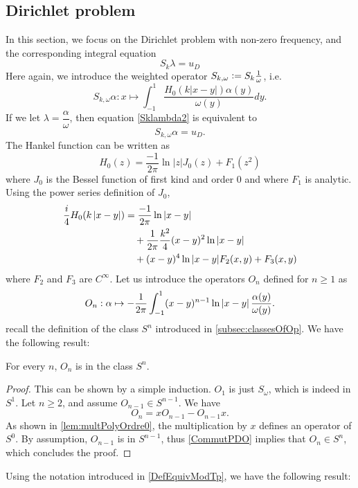\documentclass[a4paper]{article}
\begin{document}
	\subsection{Dirichlet problem}
	
	In this section, we focus on the Dirichlet problem with non-zero frequency, and the corresponding integral equation 
	\begin{equation}
	S_k \lambda = u_D
	\label{Sklambda2}
	\end{equation}
	Here again, we introduce the weighted operator $S_{k,\omega} \mathrel{\mathop:}= S_k \frac{1}{\omega}$, i.e.
	\[S_{k,\omega}\alpha : x \mapsto \int_{-1}^1 \dfrac{H_0(k|x-y|) \alpha(y)}{\omega(y)}dy.\]
	If we let $\lambda = \dfrac{\alpha}{\omega}$, then equation \eqref{Sklambda2} is equivalent to
	\[S_{k,\omega}\alpha = u_D.\]
	The Hankel function can be written as 
	\[H_0(z) = \frac{-1}{2\pi}\ln|z| J_0(z) + F_1(z^2)\]
	where $J_0$ is the Bessel function of first kind and order $0$ and where $F_1$ is analytic. Using the power series definition of $J_0$, 
	\begin{align}
	\begin{split}
	\frac{i}{4}H_0(k \left\lvert x - y \right\rvert) &= \frac{-1}{2\pi}\ln |x-y| \label{decompHankel}\\ 
	&\quad + \frac{1}{2\pi} \frac{k^2}{4} (x- y)^2 \ln |x-y|\\
	&\quad + (x-y)^4 \ln|x-y|F_2(x,y) + F_3(x,y)
	\end{split}
	\end{align}
\noindent where $F_2$ and $F_3$ are $C^{\infty}$. Let us introduce the operators $O_n$ defined for $n \geq 1$ as 
\[O_n : \alpha \mapsto -\frac{1}{2\pi}\int_{-1}^{1}(x-y)^{n-1} \ln\left\lvert x - y \right\rvert \frac{\alpha(y)}{\omega(y)}.\]
recall the definition of the class $S^n$ introduced in \autoref{subsec:classesOfOp}. We have the following result:
\begin{Lem}
	\label{orderOfOn}
	For every $n$, $O_n$ is in the class $S^n$. 
\end{Lem}
\begin{proof}
	This can be shown by a simple induction. $O_1$ is just $S_\omega$, which is indeed in $S^1$. Let $n \geq 2$, and assume $O_{n-1} \in S^{n-1}$. We have
	\[ O_n = x O_{n-1} - O_{n-1} x.\]
	As shown in \autoref{lem:multPolyOrdre0}, the multiplication by $x$ defines an operator of $S^0$. By assumption, $O_{n-1}$ is in $S^{n-1}$, thus \autoref{CommutPDO} implies that $O_{n} \in S^n$, which concludes the proof. 
\end{proof}
Using the notation introduced in \autoref{DefEquivModTp}, we have the following result:
\end{document}
